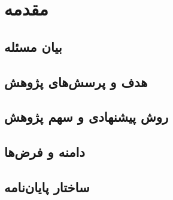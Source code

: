 \chapter{مقدمه}

\label{chap:introduction}

\section{بیان مسئله}

\section{هدف و پرسش‌های پژوهش}

\section{روش پیشنهادی و سهم پژوهش}

\section{دامنه و فرض‌ها}

\section{ساختار پایان‌نامه}
